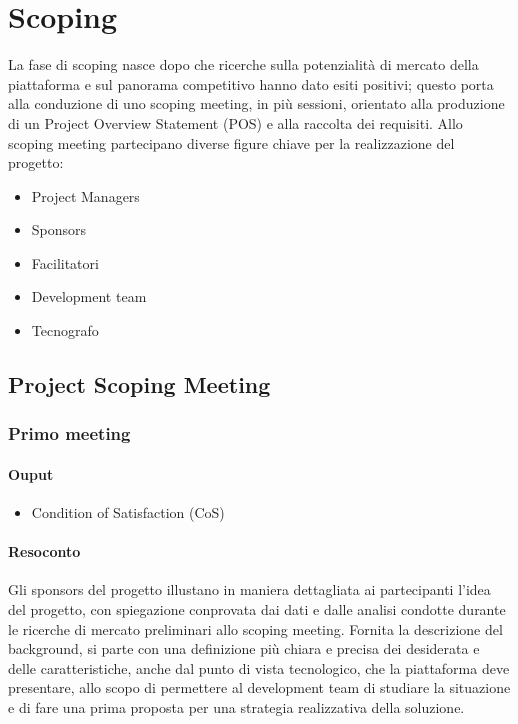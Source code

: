 \chapter{Scoping}

La fase di scoping nasce dopo che ricerche sulla potenzialità di mercato della piattaforma e sul panorama
competitivo hanno dato esiti positivi; questo porta alla conduzione di uno scoping meeting, in più sessioni, 
orientato alla produzione di un Project Overview Statement (POS) e alla raccolta dei requisiti.
Allo scoping meeting partecipano diverse figure chiave per la realizzazione del progetto:
\begin{itemize}
    \item Project Managers
    \item Sponsors
    \item Facilitatori
    \item Development team
    \item Tecnografo
\end{itemize}

\section{Project Scoping Meeting}

\subsection*{Primo meeting}
\subsubsection*{Ouput}
\begin{itemize}
    \item Condition of Satisfaction (CoS)
\end{itemize} 
\subsubsection*{Resoconto}
Gli sponsors del progetto illustano in maniera dettagliata ai partecipanti l'idea del progetto, con spiegazione 
conprovata dai dati e dalle analisi condotte durante le ricerche di mercato preliminari allo scoping meeting. 
Fornita la descrizione del background, si parte con una definizione più chiara e precisa dei desiderata e delle caratteristiche,
anche dal punto di vista tecnologico, che la piattaforma deve presentare, allo scopo di permettere al development team di studiare 
la situazione e di fare una prima proposta per una strategia realizzativa della soluzione.        
